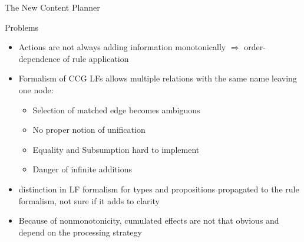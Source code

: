 \documentclass{beamer}
\begin{document}
\begin{frame}{The New Content Planner}
  \begin{block}{Problems}
    \begin{itemize}
      \item Actions are not always adding information monotonically
        $\Rightarrow$ order-dependence of rule application
      \item Formalism of CCG LFs allows multiple relations with the same name
        leaving one node:
        \begin{itemize}
        \item Selection of matched edge becomes ambiguous
        \item No proper notion of unification
        \item Equality and Subsumption hard to implement
        \item Danger of infinite additions
        \end{itemize}
      \item distinction in LF formalism for types and propositions
        propagated to the rule formalism, not sure if it adds to clarity
      \item Because of nonmonotonicity, cumulated effects are not that obvious
        and depend on the processing strategy
    \end{itemize}
  \end{block}
\end{frame}

\end{document}
